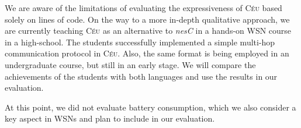 \documentclass{sig-alternate-ipsn09}
\newcommand{\2}{\;\;}
\newcommand{\5}{\;\;\;\;\;}
\newcommand{\CEU}{\textsc{C\'{e}u}}
\newcommand{\nesc}{\emph{nesC}}
\begin{document}

We are aware of the limitations of evaluating the expressiveness of \CEU{} 
based solely on lines of code.
On the way to a more in-depth qualitative approach, we are currently teaching 
\CEU{} as an alternative to \nesc{} in a hands-on WSN course in a high-school.
The students successfully implemented a simple multi-hop communication protocol 
in \CEU.
Also, the same format is being employed in an undergraduate course, but still 
in an early stage.
We will compare the achievements of the students with both languages and use 
the results in our evaluation.

At this point, we did not evaluate battery consumption, which we also consider 
a key aspect in WSNs and plan to include in our evaluation.

\end{document}
